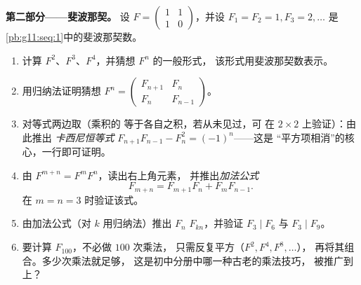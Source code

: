 \begin{problem}
\medskip
\noindent\textbf{第二部分——斐波那契。}
设 $F = \begin{pmatrix} 1 & 1\\ 1 & 0\end{pmatrix}$，并设
$F_1 = F_2 = 1, F_3 = 2, \dots$ 是
\cref{pb:g11:seq:1}中的斐波那契数。
\begin{enumerate}[resume]
  \item 计算 $F^2$、$F^3$、$F^4$，并猜想 $F^n$ 的一般形式，
        该形式用斐波那契数表示。
  \item 用归纳法证明猜想
        $F^n = \begin{pmatrix} F_{n+1} & F_n\\ F_n & F_{n-1}
        \end{pmatrix}$。
  \item 对等式两边取（乘积的
        等于各自之积，若从未见过，可
        在 $2 \times 2$ 上验证）：由此推出
        \emph{卡西尼恒等式}
        $F_{n+1}F_{n-1} - F_n^2 = (-1)^n$——这是
        “平方项相消”的核心，一行即可证明。
  \item 由 $F^{m+n} = F^m F^n$，读出右上角元素，
        并推出\emph{加法公式}
        \[
        F_{m+n} = F_{m+1} F_n + F_m F_{n-1} .
        \]
        在 $m = n = 3$ 时验证该式。
  \item 由加法公式（对 $k$ 用归纳法）推出
        $F_n$  $F_{kn}$，并验证
        $F_3 \mid F_6$ 与 $F_3 \mid F_9$。
  \item 要计算 $F_{100}$，不必做 $100$ 次乘法，
        只需反复平方（$F^2, F^4, F^8, \dots$），
        再将其组合。多少次乘法就足够，
        这是初中分册中哪一种古老的乘法技巧，
        被推广到上？
\end{enumerate}


\end{problem}
